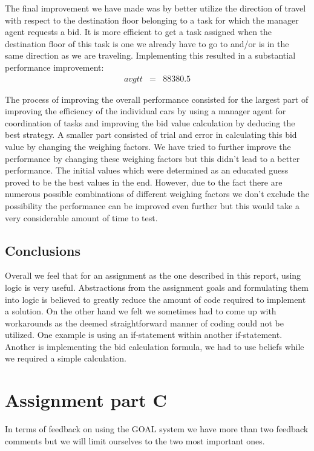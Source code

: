 \documentclass[a4paper,11pt]{article}
\begin{document}
The final improvement we have made was by better utilize the direction of travel with respect to the destination floor belonging to a task for which the manager agent requests a bid. It is more efficient to get a task assigned when the destination floor of this task is one we already have to go to and/or is in the same direction as we are traveling. Implementing this resulted in a substantial performance improvement:
\[\begin{array}{lcl}
avgtt & = & 88380.5
\end{array}\]

The process of improving the overall performance consisted for the largest part of improving the efficiency of the individual cars by using a manager agent for coordination of tasks and improving the bid value calculation by deducing the best strategy. A smaller part consisted of trial and error in calculating this bid value by changing the weighing factors. We have tried to further improve the performance by changing these weighing factors but this didn't lead to a better performance. The initial values which were determined as an educated guess proved to be the best values in the end. However, due to the fact there are numerous possible combinations of different weighing factors we don't exclude the possibility the performance can be improved even further but this would take a very considerable amount of time to test. 

\subsection{Conclusions}
Overall we feel that for an assignment as the one described in this report, using logic is very useful. Abstractions from the assignment goals and formulating them into logic is believed to greatly reduce the amount of code required to implement a solution. On the other hand we felt we sometimes had to come up with workarounds as the deemed straightforward manner of coding could not be utilized. One example is using an if-statement within another if-statement. Another is implementing the bid calculation formula, we had to use beliefs while we required a simple calculation. 

\section{Assignment part C}
In terms of feedback on using the GOAL system we have more than two feedback comments but we will limit ourselves to the two most important ones. 
\end{document}
